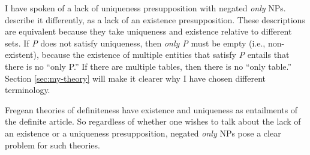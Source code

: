 I have spoken of a lack of uniqueness presupposition with negated \textit{only} NPs. \citet{cb2015} describe it differently, as a lack of an existence presupposition. These descriptions are equivalent because they take uniqueness and existence relative to different sets. If \textit{P} does not satisfy uniqueness, then \textit{only P} must be empty (i.e., non-existent), because the existence of multiple entities that satisfy \textit{P} entails that there is no ``only P.'' If there are multiple tables, then there is no ``only table.'' Section \ref{sec:my-theory} will make it clearer why I have chosen different terminology.

Fregean theories of definiteness have existence and uniqueness as entailments of the definite article. So regardless of whether one wishes to talk about the lack of an existence or a uniqueness presupposition, negated \textit{only} NPs pose a clear problem for such theories.